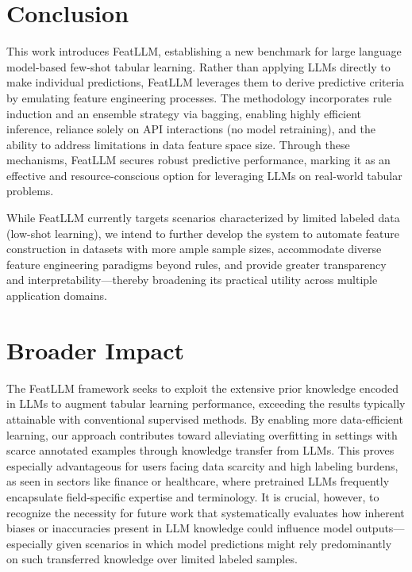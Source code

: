 \section{Conclusion}
This work introduces \textsf{FeatLLM}, establishing a new benchmark for large language model-based few-shot tabular learning. Rather than applying LLMs directly to make individual predictions, \textsf{FeatLLM} leverages them to derive predictive criteria by emulating feature engineering processes. The methodology incorporates rule induction and an ensemble strategy via bagging, enabling highly efficient inference, reliance solely on API interactions (no model retraining), and the ability to address limitations in data feature space size. Through these mechanisms, \textsf{FeatLLM} secures robust predictive performance, marking it as an effective and resource-conscious option for leveraging LLMs on real-world tabular problems.

While \textsf{FeatLLM} currently targets scenarios characterized by limited labeled data (low-shot learning), we intend to further develop the system to automate feature construction in datasets with more ample sample sizes, accommodate diverse feature engineering paradigms beyond rules, and provide greater transparency and interpretability—thereby broadening its practical utility across multiple application domains.

\section{Broader Impact} The \textsf{FeatLLM} framework seeks to exploit the extensive prior knowledge encoded in LLMs to augment tabular learning performance, exceeding the results typically attainable with conventional supervised methods. By enabling more data-efficient learning, our approach contributes toward alleviating overfitting in settings with scarce annotated examples through knowledge transfer from LLMs. This proves especially advantageous for users facing data scarcity and high labeling burdens, as seen in sectors like finance or healthcare, where pretrained LLMs frequently encapsulate field-specific expertise and terminology. It is crucial, however, to recognize the necessity for future work that systematically evaluates how inherent biases or inaccuracies present in LLM knowledge could influence model outputs—especially given scenarios in which model predictions might rely predominantly on such transferred knowledge over limited labeled samples.

